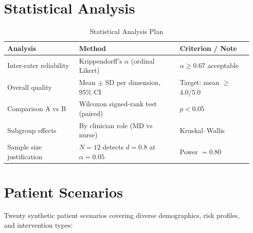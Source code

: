 \documentclass[runningheads,a4paper]{llncs}
\begin{document}
\section{Statistical Analysis}

\begin{table}[h]
\centering
\caption{Statistical Analysis Plan}
\begin{tabular}{lll}
\toprule
\textbf{Analysis} & \textbf{Method} & \textbf{Criterion / Note} \\
\midrule
Inter-rater reliability & Krippendorff's $\alpha$ (ordinal Likert) & $\alpha \geq 0.67$ acceptable \\
Overall quality & Mean $\pm$ SD per dimension, 95\% CI & Target: mean $\geq$ 4.0/5.0 \\
Comparison A vs B & Wilcoxon signed-rank test (paired) & $p < 0.05$ \\
Subgroup effects & By clinician role (MD vs nurse) & Kruskal--Wallis \\
Sample size justification & $N=12$ detects $d=0.8$ at $\alpha=0.05$ & Power $= 0.80$ \\
\bottomrule
\end{tabular}
\end{table}

\section{Patient Scenarios}

Twenty synthetic patient scenarios covering diverse demographics, risk profiles, and intervention types:
\end{document}
